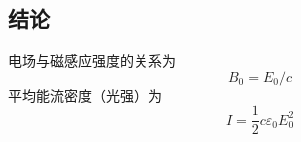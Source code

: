 
\subsection{结论}
电场与磁感应强度的关系为
\begin{equation}
B_0 = E_0/c
\end{equation}
平均能流密度（光强）为
\begin{equation}
I = \frac12 c\varepsilon_0 E_0^2
\end{equation}

